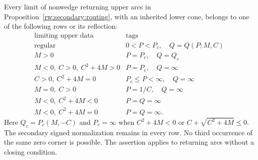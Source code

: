 \begin{proposition}\label{rw:secondary:exhaustion}
Every limit of nonwedge returning upper arcs in
Proposition~\ref{rw:secondary:routing}, with an inherited lower cone,
belongs to one of the following rows or its reflection:
\[
\begin{array}{c|c}
 \text{limiting upper data}&\text{tags}\\ \hline
 \text{regular}&0<P<P_c,\quad Q=Q(P;M,C)\\
 M>0& P=P_c,\quad Q=Q_c\\
 M<0,\ C>0,\ C^2+4M>0&P=P_c,\quad Q=\infty\\
 C>0,\ C^2+4M=0&P_c\le P<\infty,\quad Q=\infty\\
 M=0,\ C>0&P=1/C,\quad Q=\infty\\
 M<0,\ C^2+4M<0&P=Q=\infty\\
 M<0,\ C^2+4M=0&P=Q=\infty .
\end{array}
\]
Here $Q_c=P_c(M,-C)$ and $P_c=\infty$ when
$C^2+4M<0$ or $C+\sqrt{C^2+4M}\le0$.
The secondary signed normalization remains in every row.
No third occurrence of the same zero corner is possible.
The assertion applies to returning arcs without a closing condition.
\end{proposition}


